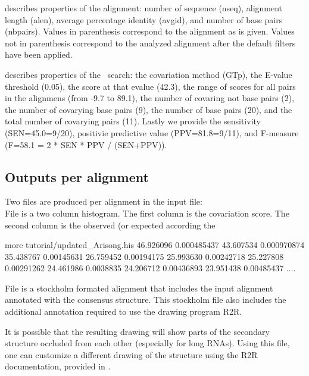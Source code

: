 \begin{sreitems}{}
\item[\emprog{First comment line}]describes properties of the
  alignment: number of sequence (nseq), alignment length (alen),
  average percentage identity (avgid), and number of base pairs
  (nbpairs).  Values in parenthesis correspond to the alignment as is
  given. Values not in parenthesis correspond to the analyzed
  alignment after the default filters have been applied.

\item[\emprog{Second comment line}]describes properties of the
  \rscape\ search: the covariation method (GTp), the E-value threshold
  (0.05), the score at that evalue (42.3), the range of scores for all
  pairs in the alignmens (from -9.7 to 89.1), the number of covaring
  not base pairs (2), the number of covarying base pairs (9), the
  number of base pairs (20), and the total number of covarying pairs
  (11). Lastly we provide the sensitivity (SEN=45.0=9/20), positivie
  predictive value (PPV=81.8=9/11), and F-measure (F=58.1 = 2 * SEN *
  PPV / (SEN+PPV)).
\end{sreitems}


\subsection{Outputs per alignment}
Two files are produced per alignment in the input file: \\

File  is a two column
histogram. The first column is the covariation score. The second
column is the observed (or expected according the
 
\begin{sreoutput}
more tutorial/updated_Arisong.his
46.926096       0.000485437
43.607534       0.000970874
35.438767       0.00145631
26.759452       0.00194175
25.993630       0.00242718
25.227808       0.00291262
24.461986       0.0038835
24.206712       0.00436893
23.951438       0.00485437
....
\end{sreoutput}


File  is a stockholm
formated alignment that includes the input alignment annotated with
the consensus structure. This stockholm file also includes the
additional annotation required to use the drawing program R2R.

It is possible that the resulting drawing will show parts of the
secondary structure occluded from each other (especially for long
RNAs).  Using this file, one can customize a different drawing of the
structure using the R2R documentation, provided in
.


